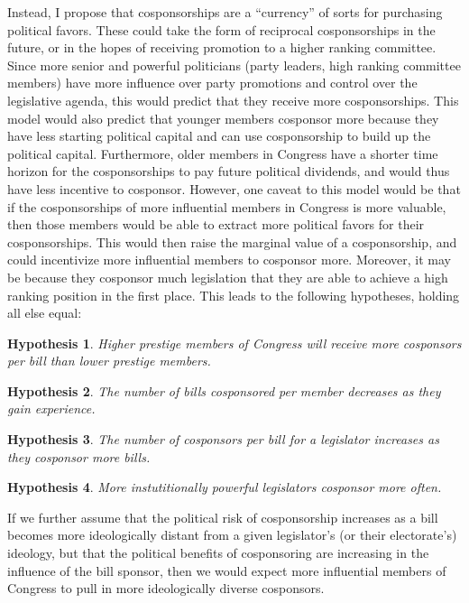 \documentclass{article}
\newtheorem{hypothesis}{Hypothesis}
\begin{document}
Instead, I propose that cosponsorships are a ``currency'' of sorts for purchasing political favors. These could take the form of reciprocal cosponsorships in the future, or in the hopes of receiving promotion to a higher ranking committee. Since more senior and powerful politicians (party leaders, high ranking committee members) have more influence over party promotions and control over the legislative agenda, this would predict that they receive more cosponsorships. This model would also predict that younger members cosponsor more because they have less starting political capital and can use cosponsorship to build up the political capital. Furthermore, older members in Congress have a shorter time horizon for the cosponsorships to pay future political dividends, and would thus have less incentive to cosponsor. However, one caveat to this model would be that if the cosponsorships of more influential members in Congress is more valuable, then those members would be able to extract more political favors for their cosponsorships. This would then raise the marginal value of a cosponsorship, and could incentivize more influential members to cosponsor more. Moreover, it may be because they cosponsor much legislation that they are able to achieve a high ranking position in the first place. This leads to the following hypotheses, holding all else equal:

\begin{hypothesis}
    \label{hyp:cosponsors_per_bill}
    Higher prestige members of Congress will receive more cosponsors per bill than lower prestige members.
\end{hypothesis}
\begin{hypothesis}
    \label{hyp:bills_cosponsored_experience}
    The number of bills cosponsored per member decreases as they gain experience. 
\end{hypothesis}
\begin{hypothesis}
    \label{hyp:reciprocal_cosponsorship}
    The number of cosponsors per bill for a legislator increases as they cosponsor more bills. 
\end{hypothesis}
\begin{hypothesis}
    \label{hyp:leadership_cosponsors}
    More instutitionally powerful legislators cosponsor more often.
\end{hypothesis}

If we further assume that the political risk of cosponsorship increases as a bill becomes more ideologically distant from a given legislator's (or their electorate's) ideology, but that the political benefits of cosponsoring are increasing in the influence of the bill sponsor, then we would expect more influential members of Congress to pull in more ideologically diverse cosponsors.
\end{document}
